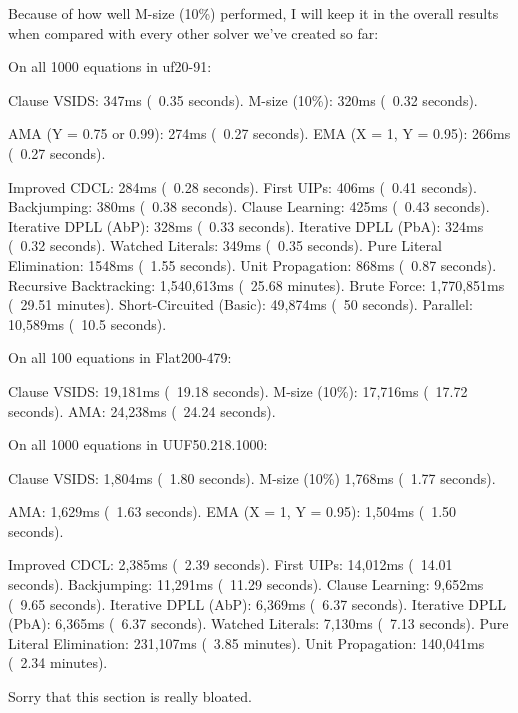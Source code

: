 \documentclass[../main.tex]{subfiles}
\begin{document}
Because of how well M-size (10\%) performed, I will keep it in the overall results 
when compared with every other solver we've created so far:

\begin{FVerbatim}
On all 1000 equations in uf20-91:

Clause VSIDS:               347ms (~0.35 seconds).
M-size (10\%):              320ms (~0.32 seconds).

AMA (Y = 0.75 or 0.99):     274ms (~0.27 seconds).
EMA (X = 1, Y = 0.95):      266ms (~0.27 seconds).

Improved CDCL:              284ms (~0.28 seconds).
First UIPs:                 406ms (~0.41 seconds).
Backjumping:                380ms (~0.38 seconds).
Clause Learning:            425ms (~0.43 seconds).
Iterative DPLL (AbP):       328ms (~0.33 seconds).
Iterative DPLL (PbA):       324ms (~0.32 seconds).
Watched Literals:           349ms (~0.35 seconds).
Pure Literal Elimination:   1548ms (~1.55 seconds).
Unit Propagation:           868ms (~0.87 seconds).
Recursive Backtracking:     1,540,613ms (~25.68 minutes).
Brute Force:                1,770,851ms (~29.51 minutes).
Short-Circuited (Basic):    49,874ms (~50 seconds).
Parallel:                   10,589ms (~10.5 seconds).

On all 100 equations in Flat200-479:

Clause VSIDS:               19,181ms (~19.18 seconds).
M-size (10\%):              17,716ms (~17.72 seconds).
AMA:                        24,238ms (~24.24 seconds).

On all 1000 equations in UUF50.218.1000:

Clause VSIDS:               1,804ms (~1.80 seconds).
M-size (10\%)               1,768ms (~1.77 seconds).

AMA:                        1,629ms (~1.63 seconds).
EMA (X = 1, Y = 0.95):      1,504ms (~1.50 seconds).

Improved CDCL:              2,385ms (~2.39 seconds).
First UIPs:                 14,012ms (~14.01 seconds).
Backjumping:                11,291ms (~11.29 seconds).
Clause Learning:            9,652ms (~9.65 seconds).
Iterative DPLL (AbP):       6,369ms (~6.37 seconds).
Iterative DPLL (PbA):       6,365ms (~6.37 seconds).
Watched Literals:           7,130ms (~7.13 seconds).
Pure Literal Elimination:   231,107ms (~3.85 minutes).
Unit Propagation:           140,041ms (~2.34 minutes).
\end{FVerbatim}
\noindent
Sorry that this section is really bloated.
\end{document}
